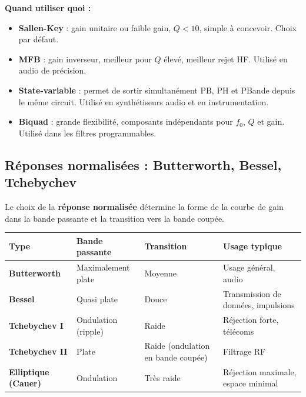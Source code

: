\documentclass[12pt,a4paper,twoside]{book}
\begin{document}
\begin{pratique}
\textbf{Quand utiliser quoi :}
\begin{itemize}[nosep]
\item \textbf{Sallen-Key} : gain unitaire ou faible gain, $Q < 10$, simple à concevoir. Choix par défaut.
\item \textbf{MFB} : gain inverseur, meilleur pour $Q$ élevé, meilleur rejet HF. Utilisé en audio de précision.
\item \textbf{State-variable} : permet de sortir simultanément PB, PH et PBande depuis le même circuit. Utilisé en synthétiseurs audio et en instrumentation.
\item \textbf{Biquad} : grande flexibilité, composants indépendants pour $f_0$, $Q$ et gain. Utilisé dans les filtres programmables.
\end{itemize}
\end{pratique}

\subsection{Réponses normalisées : Butterworth, Bessel, Tchebychev}

Le choix de la \textbf{réponse normalisée} détermine la forme de la courbe de gain dans la bande passante et la transition vers la bande coupée.

\begin{center}
\renewcommand{\arraystretch}{1.5}
\begin{tabular}{p{2.8cm}p{2.5cm}p{2.5cm}p{4.5cm}}
\toprule
\textbf{Type} & \textbf{Bande passante} & \textbf{Transition} & \textbf{Usage typique} \\
\midrule
\textbf{Butterworth} & Maximalement plate & Moyenne & Usage général, audio \\
\textbf{Bessel} & Quasi plate & Douce & Transmission de données, impulsions \\
\textbf{Tchebychev I} & Ondulation (ripple) & Raide & Réjection forte, télécoms \\
\textbf{Tchebychev II} & Plate & Raide (ondulation en bande coupée) & Filtrage RF \\
\textbf{Elliptique (Cauer)} & Ondulation & Très raide & Réjection maximale, espace minimal \\
\bottomrule
\end{tabular}
\end{center}
\end{document}
